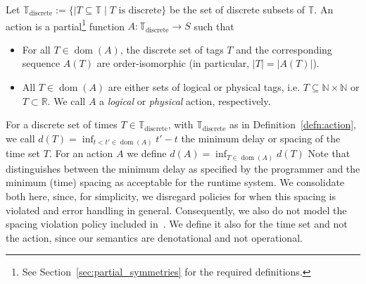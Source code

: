 \begin{defn}
    \label{defn:action}
Let $\mathbb{T}_\text{discrete} := \{ \mid T \subseteq \mathbb{T} \mid T \text{ is discrete}  \}$ be the set of discrete subsets of $\mathbb{T}$.
An action is a partial\footnote{See Section~\ref{sec:partial_symmetries} for the required definitions.} function $A : \mathbb{T}_\text{discrete} \rightarrow S$ such that
\begin{itemize}
    \item For all $T \in \operatorname{dom}(A)$, the discrete set of tags $T$ and the corresponding sequence $A(T)$ are order-isomorphic (in particular, $|T| = |A(T)|$).
    \item All $T \in \operatorname{dom}(A)$ are either sets of logical or physical tags, i.e. $T \subseteq \mathbb{N} \times \mathbb{N}$ or $T  \subset \mathbb{R}$. We call $A$ a \emph{logical} or \emph{physical} action, respectively.
\end{itemize}
\end{defn}

For a discrete set of times $T \in \mathbb{T}_\text{discrete}$, with $\mathbb{T}_\text{discrete}$ as in Definition~\ref{defn:action}, we call $d(T) = \operatorname{inf}_{t < t' \in \operatorname{dom}(A)} t' - t$ the minimum delay or spacing of the time set $T$. 
For an action $A$ we define $d(A) = \operatorname{inf}_{T \in \operatorname{dom}(A)} d(T)$
Note that~\cite{lohstroh_phdthesis} distinguishes between the minimum delay as specified by the programmer and the minimum (time) spacing as acceptable for the runtime system.
We consolidate both here, since, for simplicity, we disregard policies for when this spacing is violated and error handling in general.
Consequently, we also do not model the spacing violation policy included in~\cite{lohstroh_phdthesis}. 
We define it also for the time set and not the action, since our semantics are denotational and not operational.


